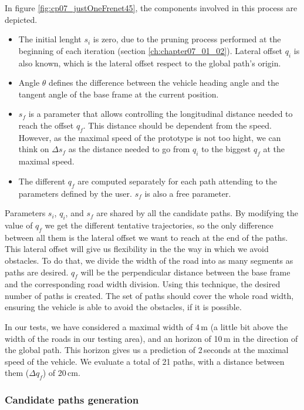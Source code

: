 In figure \ref{fig:cp07_justOneFrenet45}, the components involved in this process are depicted.
\begin{itemize}
 \item The initial lenght $s_i$ is zero, due to the pruning process performed at the beginning of each iteration (section \ref{ch:chapter07_01_02}). Lateral offset $q_i$ is also known, which is the lateral offset respect to the global path's origin.
 \item Angle $\theta$ defines the difference between the vehicle heading angle and the tangent angle of the base frame at the current position.
 \item $s_f$ is a parameter that allows controlling the longitudinal distance needed to reach the offset $q_f$. This distance should be dependent from the speed. However, as the maximal speed of the prototype is not too hight, we can think on $\Delta s_f$ as the distance needed to go from $q_i$ to the biggest $q_f$ at the maximal speed.
 \item The different $q_f$ are computed separately for each path attending to the parameters defined by the user. $s_f$ is also a free parameter.
\end{itemize}

Parameters $s_i$, $q_i$, and $s_f$ are shared by all the candidate paths. By modifying the value of $q_f$ we get the different tentative trajectories, so the only difference between all them is the lateral offset we want to reach at the end of the paths. This lateral offset will give us flexibility in the the way in which we avoid obstacles. To do that, we divide the width of the road into as many segments as paths are desired. $q_f$ will be the perpendicular distance between the base frame and the corresponding road width division. Using this technique, the desired number of paths is created. The set of paths should cover the whole road width, ensuring the vehicle is able to avoid the obstacles, if it is possible.

In our tests, we have considered a maximal width of 4\,m (a little bit above the width of the roads in our testing area), and an horizon of 10\,m in the direction of the global path. This horizon gives us a prediction of 2\,seconds at the maximal speed of the vehicle. We evaluate a total of 21 paths, with a distance between them ($\Delta q_f$) of 20\,cm.

\subsubsection{Candidate paths generation}\label{ch:chapter07_01_03_02}

